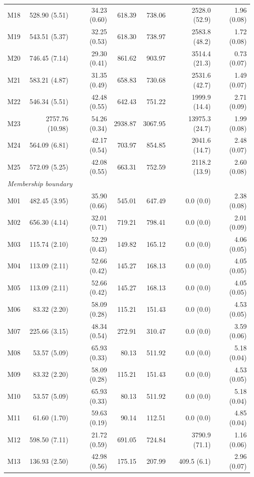 \documentclass[11pt]{article}
\theoremstyle{remark}
\begin{document}
\begin{longtable}{lrrrrrr}
M18 & 528.90 (5.51) & 34.23 (0.60) & 618.39 & 738.06 & 2528.0 (52.9) & 1.96 (0.08) \\
M19 & 543.51 (5.37) & 32.25 (0.53) & 618.30 & 738.97 & 2583.8 (48.2) & 1.72 (0.08) \\
M20 & 746.45 (7.14) & 29.30 (0.41) & 861.62 & 903.97 & 3514.4 (21.3) & 0.73 (0.07) \\
M21 & 583.21 (4.87) & 31.35 (0.49) & 658.83 & 730.68 & 2531.6 (42.7) & 1.49 (0.07) \\
M22 & 546.34 (5.51) & 42.48 (0.55) & 642.43 & 751.22 & 1999.9 (14.4) & 2.71 (0.09) \\
M23 & 2757.76 (10.98) & 54.26 (0.34) & 2938.87 & 3067.95 & 13975.3 (24.7) & 1.99 (0.08) \\
M24 & 564.09 (6.81) & 42.17 (0.54) & 703.97 & 854.85 & 2041.6 (14.7) & 2.48 (0.07) \\
M25 & 572.09 (5.25) & 42.08 (0.55) & 663.31 & 752.59 & 2118.2 (13.9) & 2.60 (0.08) \\
\multicolumn{7}{l}{\textit{Membership boundary}} \\
M01 & 482.45 (3.95) & 35.90 (0.66) & 545.01 & 647.49 & 0.0 (0.0) & 2.38 (0.08) \\
M02 & 656.30 (4.14) & 32.01 (0.71) & 719.21 & 798.41 & 0.0 (0.0) & 2.01 (0.09) \\
M03 & 115.74 (2.10) & 52.29 (0.43) & 149.82 & 165.12 & 0.0 (0.0) & 4.06 (0.05) \\
M04 & 113.09 (2.11) & 52.66 (0.42) & 145.27 & 168.13 & 0.0 (0.0) & 4.05 (0.05) \\
M05 & 113.09 (2.11) & 52.66 (0.42) & 145.27 & 168.13 & 0.0 (0.0) & 4.05 (0.05) \\
M06 & 83.32 (2.20) & 58.09 (0.28) & 115.21 & 151.43 & 0.0 (0.0) & 4.53 (0.05) \\
M07 & 225.66 (3.15) & 48.34 (0.54) & 272.91 & 310.47 & 0.0 (0.0) & 3.59 (0.06) \\
M08 & 53.57 (5.09) & 65.93 (0.33) & 80.13 & 511.92 & 0.0 (0.0) & 5.18 (0.04) \\
M09 & 83.32 (2.20) & 58.09 (0.28) & 115.21 & 151.43 & 0.0 (0.0) & 4.53 (0.05) \\
M10 & 53.57 (5.09) & 65.93 (0.33) & 80.13 & 511.92 & 0.0 (0.0) & 5.18 (0.04) \\
M11 & 61.60 (1.70) & 59.63 (0.19) & 90.14 & 112.51 & 0.0 (0.0) & 4.85 (0.04) \\
M12 & 598.50 (7.11) & 21.72 (0.59) & 691.05 & 724.84 & 3790.9 (71.1) & 1.16 (0.06) \\
M13 & 136.93 (2.50) & 42.98 (0.56) & 175.15 & 207.99 & 409.5 (6.1) & 2.96 (0.07) \\

\end{longtable}
\end{document}
